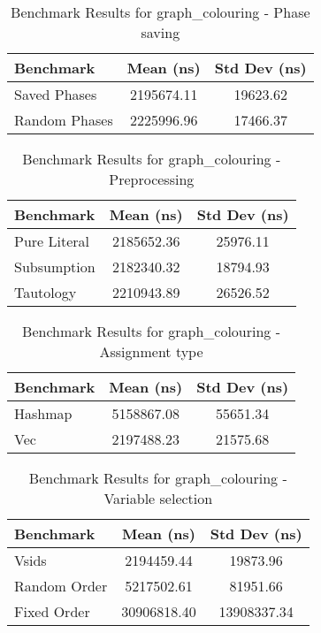 \begin{table}[h]
    \centering
    \caption{Benchmark Results for graph_colouring - Phase saving}
    \begin{tabular}{|l|c|c|}
        \hline
        Benchmark & Mean (ns) & Std Dev (ns) \\
        \hline
        Saved Phases & 2195674.11 & 19623.62 \\
        Random Phases & 2225996.96 & 17466.37 \\
        \hline
    \end{tabular}
\end{table}


\begin{table}[h]
    \centering
    \caption{Benchmark Results for graph_colouring - Preprocessing}
    \begin{tabular}{|l|c|c|}
        \hline
        Benchmark & Mean (ns) & Std Dev (ns) \\
        \hline
        Pure Literal & 2185652.36 & 25976.11 \\
        Subsumption & 2182340.32 & 18794.93 \\
        Tautology & 2210943.89 & 26526.52 \\
        \hline
    \end{tabular}
\end{table}


\begin{table}[h]
    \centering
    \caption{Benchmark Results for graph_colouring - Assignment type}
    \begin{tabular}{|l|c|c|}
        \hline
        Benchmark & Mean (ns) & Std Dev (ns) \\
        \hline
        Hashmap & 5158867.08 & 55651.34 \\
        Vec & 2197488.23 & 21575.68 \\
        \hline
    \end{tabular}
\end{table}


\begin{table}[h]
    \centering
    \caption{Benchmark Results for graph_colouring - Variable selection}
    \begin{tabular}{|l|c|c|}
        \hline
        Benchmark & Mean (ns) & Std Dev (ns) \\
        \hline
        Vsids & 2194459.44 & 19873.96 \\
        Random Order & 5217502.61 & 81951.66 \\
        Fixed Order & 30906818.40 & 13908337.34 \\
        \hline
    \end{tabular}
\end{table}



